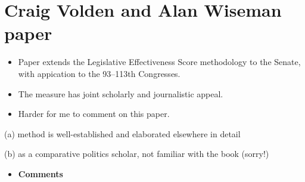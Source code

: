 \documentclass{article}
\begin{document}
\section{Craig Volden and Alan Wiseman paper}
\label{sec:org48aabbc}

\begin{itemize}
\item Paper extends the Legislative Effectiveness Score methodology to the Senate, with appication to the 93--113th Congresses.

\item The measure has joint scholarly and journalistic appeal.

\item Harder for me to comment on this paper.
\end{itemize}

(a) method is well-established and elaborated elsewhere in detail

(b) as a comparative politics scholar, not familiar with the book (sorry!)

\begin{itemize}
\item \textbf{Comments}
\end{itemize}
\end{document}
